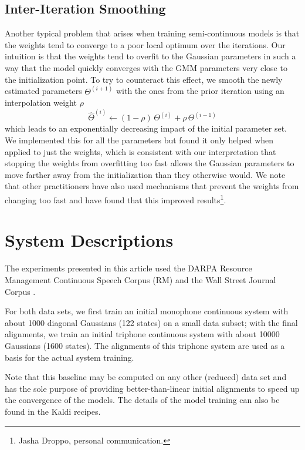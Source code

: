 \documentclass{article}
\begin{document}
\subsection{Inter-Iteration Smoothing}
Another typical problem that arises when training semi-continuous models is
that the weights tend to converge to a poor local optimum over the iterations. 
Our intuition is that the weights tend to overfit to the Gaussian parameters
in such a way that the model quickly converges with the
GMM parameters very close to the initialization point.
%
To try to counteract this effect, we smooth the newly estimated parameters 
$\Theta^{(i+1)}$ with the ones from the prior iteration using an interpolation weight $\rho$
\begin{equation}
\hat\Theta^{(i)} \leftarrow (1 - \rho) \, \Theta^{(i)} + \rho \, \Theta^{(i-1)} %
\end{equation}
which leads to an exponentially decreasing impact of the initial parameter set.
We implemented this for all the parameters but found it only helped when
applied to just the weights,
which is consistent with our interpretation that stopping the weights from overfitting
too fast allows the Gaussian parameters to move farther away from the initialization
than they otherwise would.
We note that other practitioners have also used mechanisms that
prevent the weights from changing too fast and
have found that this improved results\footnote{Jasha Droppo, personal communication.}.


\section{System Descriptions}
\label{sec:sys}

The experiments presented in this article used the DARPA Resource 
Management Continuous Speech Corpus (RM) \cite{price1993rm} and the Wall Street
Journal Corpus \cite{garofalo2007wsj}.

For both data sets, we first train an initial monophone continuous system
with about 1000 diagonal Gaussians (122 states) on a small data subset; with 
the final alignments, we train an initial triphone continuous system with 
about 10000 Gaussians (1600 states).  The alignments of this triphone system
are used as a basis for the actual system training.

Note that this baseline may be computed on any other (reduced) data set
and has the sole purpose of providing better-than-linear initial alignments
to speed up the convergence of the models.
%
The details of the model training can also be found in the {\sc Kaldi} recipes.
\end{document}
